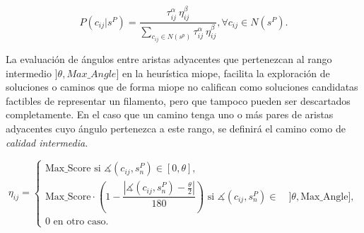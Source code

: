 \begin{equation}
P(c_{ij} | s^{P}) = \frac
        {\tau_{ij}^{\alpha} ~ \eta_{ij}^{\beta}}
        {\sum\limits_{c_{ij}\in N(s^p)}{\tau_{ij}^{\alpha} ~ \eta_{ij}^{\beta} } }, \forall c_{ij} \in N(s^{P}).
\label{eq:antProbabilities}
\end{equation}

La evaluaci\'on de \'angulos entre aristas adyacentes que pertenezcan al rango intermedio $]\theta, Max\_Angle]$ en la heur\'istica miope, facilita la exploraci\'on de soluciones o caminos que de forma miope no califican como soluciones candidatas factibles de representar un filamento, pero que tampoco pueden ser descartados completamente. En el caso que un camino tenga uno o m\'as pares de aristas adyacentes cuyo \'angulo pertenezca a este rango, se definir\'a el camino como de {\it calidad intermedia}.


\begin{equation}
    \eta_{ij} = 
        \begin{cases} 
        \text{Max\_Score si } \measuredangle(c_{ij}, s_{n}^{P}) \in [0, \theta],\\[3ex]
        
        \text{Max\_Score} \cdot \left(1 - \dfrac{ \left| \measuredangle(c_{ij}, s_{n}^{P}) - \frac{\theta}{2} \right|} {180} \right)  \text{ si } \measuredangle(c_{ij}, s_{n}^{P}) \in \quad ]\theta, \text{Max\_Angle}],\\[3ex]
        
        \text{0 en otro caso.}
        \end{cases}
    \label{eq:heuristicaMiope}
\end{equation}

